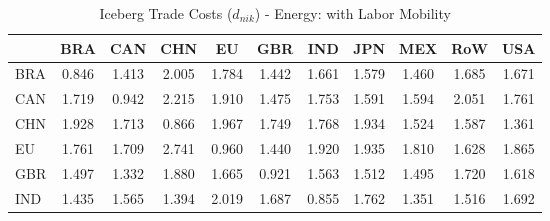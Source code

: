 \begin{table}[htbp]
\centering
\caption{Iceberg Trade Costs ($d_{nik}$) - Energy: with Labor Mobility} 
\label{tab:iceberg_Energy}
\begin{tabular}{lcccccccccc}
  \hline
 & BRA & CAN & CHN & EU & GBR & IND & JPN & MEX & RoW & USA \\ 
  \hline
BRA & \textcolor[RGB]{252,163,3}{0.846} & \textcolor[RGB]{207,134,48}{1.413} & \textcolor[RGB]{18,12,237}{2.005} & \textcolor[RGB]{59,38,196}{1.784} & \textcolor[RGB]{194,125,61}{1.442} & \textcolor[RGB]{125,81,130}{1.661} & \textcolor[RGB]{148,96,107}{1.579} & \textcolor[RGB]{191,124,64}{1.460} & \textcolor[RGB]{110,71,145}{1.685} & \textcolor[RGB]{117,76,138}{1.671} \\ 
  CAN & \textcolor[RGB]{87,56,168}{1.719} & \textcolor[RGB]{235,152,20}{0.942} & \textcolor[RGB]{5,3,250}{2.215} & \textcolor[RGB]{38,25,217}{1.910} & \textcolor[RGB]{186,120,69}{1.475} & \textcolor[RGB]{77,50,178}{1.753} & \textcolor[RGB]{140,91,115}{1.591} & \textcolor[RGB]{138,89,117}{1.594} & \textcolor[RGB]{13,8,242}{2.051} & \textcolor[RGB]{74,48,181}{1.761} \\ 
  CHN & \textcolor[RGB]{33,21,222}{1.928} & \textcolor[RGB]{89,58,166}{1.713} & \textcolor[RGB]{245,158,10}{0.866} & \textcolor[RGB]{23,15,232}{1.967} & \textcolor[RGB]{79,51,176}{1.749} & \textcolor[RGB]{64,41,191}{1.768} & \textcolor[RGB]{31,20,224}{1.934} & \textcolor[RGB]{161,104,94}{1.524} & \textcolor[RGB]{145,94,110}{1.587} & \textcolor[RGB]{219,142,36}{1.361} \\ 
  EU & \textcolor[RGB]{71,46,184}{1.761} & \textcolor[RGB]{92,59,163}{1.709} & \textcolor[RGB]{0,0,255}{2.741} & \textcolor[RGB]{232,150,23}{0.960} & \textcolor[RGB]{196,127,59}{1.440} & \textcolor[RGB]{36,23,219}{1.920} & \textcolor[RGB]{28,18,227}{1.935} & \textcolor[RGB]{51,33,204}{1.810} & \textcolor[RGB]{130,84,125}{1.628} & \textcolor[RGB]{43,28,212}{1.865} \\ 
  GBR & \textcolor[RGB]{178,115,76}{1.497} & \textcolor[RGB]{227,147,28}{1.332} & \textcolor[RGB]{41,26,214}{1.880} & \textcolor[RGB]{120,78,135}{1.665} & \textcolor[RGB]{237,153,18}{0.921} & \textcolor[RGB]{153,99,102}{1.563} & \textcolor[RGB]{166,107,89}{1.512} & \textcolor[RGB]{181,117,74}{1.495} & \textcolor[RGB]{84,54,171}{1.720} & \textcolor[RGB]{135,87,120}{1.618} \\ 
  IND & \textcolor[RGB]{199,129,56}{1.435} & \textcolor[RGB]{150,97,105}{1.565} & \textcolor[RGB]{212,137,43}{1.394} & \textcolor[RGB]{15,10,240}{2.019} & \textcolor[RGB]{107,69,148}{1.687} & \textcolor[RGB]{250,162,5}{0.855} & \textcolor[RGB]{69,45,186}{1.762} & \textcolor[RGB]{222,144,33}{1.351} & \textcolor[RGB]{163,106,92}{1.516} & \textcolor[RGB]{105,68,150}{1.692} \\ 

\end{tabular}
\end{table}
